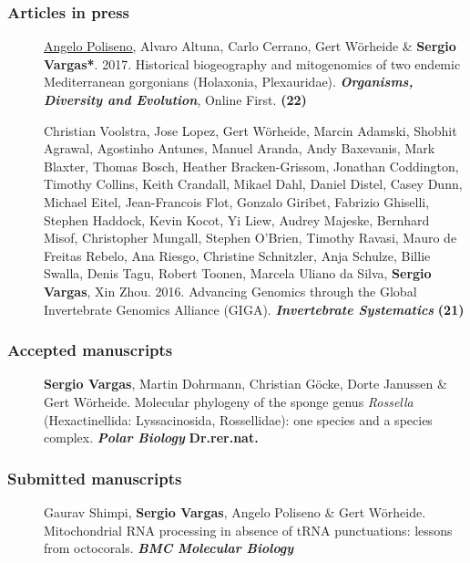 \documentclass[letter,10pt]{article}
\begin{document}
\subsubsection*{Articles in press}
\begin{description}

\item[]\underline{\underline{Angelo Poliseno}}, Alvaro Altuna, Carlo Cerrano, Gert W\"orheide \& \textbf{Sergio Vargas*}. 2017. Historical biogeography and mitogenomics of two endemic Mediterranean gorgonians (Holaxonia, Plexauridae). \textbf{\emph{Organisms, Diversity and Evolution}}, Online First. \hfill\textbf{{\scriptsize (22)}}

\item[] Christian Voolstra, Jose Lopez, Gert W\"orheide, Marcin Adamski, Shobhit Agrawal, Agostinho Antunes, Manuel Aranda, Andy Baxevanis, Mark Blaxter, Thomas Bosch, Heather Bracken-Grissom, Jonathan Coddington, Timothy Collins, Keith Crandall, Mikael Dahl, Daniel Distel, Casey Dunn, Michael Eitel, Jean-Francois Flot, Gonzalo Giribet, Fabrizio Ghiselli, Stephen Haddock, Kevin Kocot, Yi Liew, Audrey Majeske, Bernhard Misof, Christopher Mungall, Stephen O'Brien, Timothy Ravasi, Mauro de Freitas Rebelo, Ana Riesgo, Christine Schnitzler, Anja Schulze, Billie Swalla, Denis Tagu, Robert Toonen, Marcela Uliano da Silva, \textbf{Sergio Vargas}, Xin Zhou. 2016. Advancing Genomics through the Global Invertebrate Genomics Alliance (GIGA). \textbf{\emph{Invertebrate Systematics}} \hfill\textbf{{\scriptsize (21)}}

\end{description}

\subsubsection*{Accepted manuscripts}
\begin{description}
\item[]\textbf{Sergio Vargas}, Martin Dohrmann, Christian G\"ocke, Dorte Janussen \& Gert W\"orheide. Molecular phylogeny of the sponge genus \emph{Rossella} (Hexactinellida: Lyssacinosida, Rossellidae): one species and a species complex. \textbf{\emph{Polar Biology}} \hfill\textbf{{\scriptsize Dr.rer.nat.}}
\end{description}

\subsubsection*{Submitted manuscripts}%
\begin{description}
  
  \item[]Gaurav Shimpi, \textbf{Sergio Vargas}, Angelo Poliseno \& Gert W\"orheide. Mitochondrial RNA processing in absence of tRNA punctuations: lessons from octocorals. \textbf{\emph{BMC Molecular Biology}}
\end{description}
\end{document}
